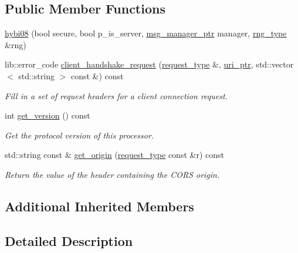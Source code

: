 \subsection*{Public Member Functions}
\begin{DoxyCompactItemize}
\item 
\hyperlink{classwebsocketpp_1_1processor_1_1hybi08_aee51a54933474952a77d7dbe8ce1e06b}{hybi08} (bool secure, bool p\+\_\+is\+\_\+server, \hyperlink{classwebsocketpp_1_1processor_1_1hybi08_a4ad1477463712031772e8e8a48cdc7b0}{msg\+\_\+manager\+\_\+ptr} manager, \hyperlink{classwebsocketpp_1_1processor_1_1hybi08_af8b10cde566c24d29a94f50716fdcddd}{rng\+\_\+type} \&rng)
\item 
lib\+::error\+\_\+code \hyperlink{classwebsocketpp_1_1processor_1_1hybi08_a9acdee11a1b8f7ae57d8f01706dd9cc0}{client\+\_\+handshake\+\_\+request} (\hyperlink{classwebsocketpp_1_1processor_1_1hybi08_a5cb5a8054a9e10706e672de379284a2e}{request\+\_\+type} \&, \hyperlink{namespacewebsocketpp_aae370ea5ac83a8ece7712cb39fc23f5b}{uri\+\_\+ptr}, std\+::vector$<$ std\+::string $>$ const \&) const 
\begin{DoxyCompactList}\small\item\em Fill in a set of request headers for a client connection request. \end{DoxyCompactList}\item 
int \hyperlink{classwebsocketpp_1_1processor_1_1hybi08_a4bc5db5ada6ef3325c76174492a36a2c}{get\+\_\+version} () const 
\begin{DoxyCompactList}\small\item\em Get the protocol version of this processor. \end{DoxyCompactList}\item 
std\+::string const \& \hyperlink{classwebsocketpp_1_1processor_1_1hybi08_af27748734048d0bcdbd904a446146d7a}{get\+\_\+origin} (\hyperlink{classwebsocketpp_1_1processor_1_1hybi08_a5cb5a8054a9e10706e672de379284a2e}{request\+\_\+type} const \&r) const 
\begin{DoxyCompactList}\small\item\em Return the value of the header containing the C\+O\+R\+S origin. \end{DoxyCompactList}\end{DoxyCompactItemize}
\subsection*{Additional Inherited Members}


\subsection{Detailed Description}
